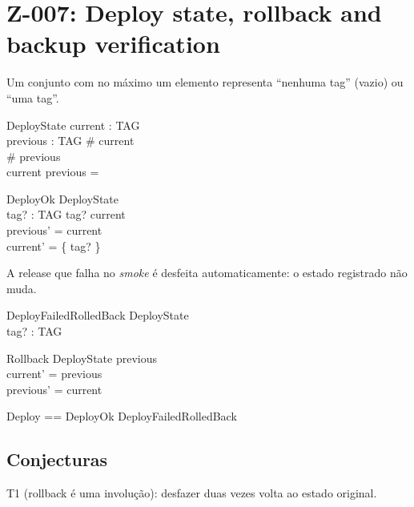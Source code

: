 \documentclass{article}
\begin{document}
\section*{Z-007: Deploy state, rollback and backup verification}

\begin{zed}
\end{zed}

Um conjunto com no máximo um elemento representa ``nenhuma tag'' (vazio) ou ``uma tag''.

\begin{schema}{DeployState}
  current : \power TAG \\
  previous : \power TAG
\where
  \# current  \\
  \# previous  \\
  current \cap previous = \emptyset
\end{schema}

\begin{schema}{DeployOk}
  \Delta DeployState \\
  tag? : TAG
\where
  tag? \notin current \\
  previous' = current \\
  current' = \{ tag? \}
\end{schema}

A release que falha no \emph{smoke} é desfeita automaticamente: o estado registrado não muda.

\begin{schema}{DeployFailedRolledBack}
  \Xi DeployState \\
  tag? : TAG
\end{schema}

\begin{schema}{Rollback}
  \Delta DeployState
\where
  previous \neq \emptyset \\
  current' = previous \\
  previous' = current
\end{schema}

\begin{zed}
  Deploy == DeployOk \lor DeployFailedRolledBack
\end{zed}

\subsection*{Conjecturas}

T1 (rollback é uma involução): desfazer duas vezes volta ao estado original.
\end{document}
